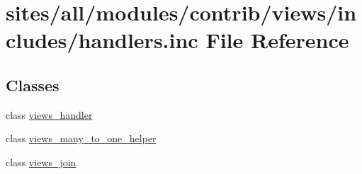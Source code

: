 \hypertarget{handlers_8inc}{
\section{sites/all/modules/contrib/views/includes/handlers.inc File Reference}
\label{handlers_8inc}
}
\subsection*{Classes}
\begin{CompactItemize}
\item 
class \hyperlink{classviews__handler}{views\_\-handler}
\item 
class \hyperlink{classviews__many__to__one__helper}{views\_\-many\_\-to\_\-one\_\-helper}
\item 
class \hyperlink{classviews__join}{views\_\-join}
\end{CompactItemize}
